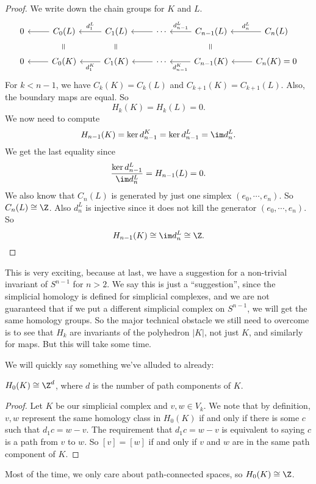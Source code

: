 \documentclass[a4paper]{article}
\begin{document}
\begin{proof}
  We write down the chain groups for $K$ and $L$.
  \[
    \begin{tikzcd}
      0 & C_0(L) \ar[l] \ar[d, phantom, "\rotatebox{90}{=}"] & C_1(L) \ar [l, "d_1^L"'] \ar[d, phantom, "\rotatebox{90}{=}"] & \cdots \ar[l] & C_{n - 1}(L) \ar[l, "d_{n - 1}^L"'] \ar[d, phantom, "\rotatebox{90}{=}"] & C_n(L) \ar[l, "d_n^L"']\\
      0 & C_0(K) \ar[l] & C_1(K) \ar [l, "d_1^K"] & \cdots \ar[l] & C_{n - 1}(K) \ar[l, "d_{n - 1}^K"] & C_n(K) = 0\ar[l]
    \end{tikzcd}
  \]
  For $k < n - 1$, we have $C_k(K) = C_k(L)$ and $C_{k + 1}(K) = C_{k + 1}(L)$. Also, the boundary maps are equal. So
  \[
    H_k(K) = H_k(L) = 0.
  \]
  We now need to compute
  \[
    H_{n - 1}(K) = \ker d_{n - 1}^K = \ker d_{n - 1}^L = \im d_n^L.
  \]
  We get the last equality since
  \[
    \frac{\ker d_{n - 1}^L}{\im d_n^L} = H_{n - 1}(L) = 0.
  \]
  We also know that $C_n (L)$ is generated by just one simplex $(e_0, \cdots, e_n)$. So $C_n(L) \cong \Z$. Also $d_n^L$ is injective since it does not kill the generator $(e_0, \cdots, e_n)$. So
  \[
    H_{n - 1}(K) \cong \im d_n^L \cong \Z.\qedhere
  \]
\end{proof}
This is very exciting, because at last, we have a suggestion for a non-trivial invariant of $S^{n - 1}$ for $n > 2$. We say this is just a ``suggestion'', since the simplicial homology is defined for simplicial complexes, and we are not guaranteed that if we put a different simplicial complex on $S^{n - 1}$, we will get the same homology groups. So the major technical obstacle we still need to overcome is to see that $H_k$ are invariants of the polyhedron $|K|$, not just $K$, and similarly for maps. But this will take some time.

We will quickly say something we've alluded to already:
\begin{lemma}[Interpretation of $H_0$]
  $H_0(K) \cong \Z^d$, where $d$ is the number of path components of $K$.
\end{lemma}

\begin{proof}
  Let $K$ be our simplicial complex and $v, w \in V_k$. We note that by definition, $v, w$ represent the same homology class in $H_0(K)$ if and only if there is some $c$ such that $d_1 c = w - v$. The requirement that $d_1 c = w - v$ is equivalent to saying $c$ is a path from $v$ to $w$. So $[v] = [w]$ if and only if $v$ and $w$ are in the same path component of $K$.
\end{proof}
Most of the time, we only care about path-connected spaces, so $H_0(K) \cong \Z$.
\end{document}
